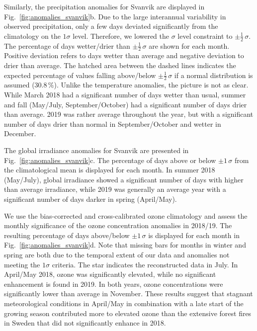 \documentclass[bg, manuscript]{copernicus}
\begin{document}
Similarly, the precipitation anomalies for Svanvik are displayed in Fig.~\ref{fig:anomalies_svanvik}b. Due to the large interannual variability in observed precipitation, only a few days deviated significantly from the climatology on the $1 \sigma$ level. Therefore, we lowered the $\sigma$ level constraint to $\pm \frac{1}{2}\,\sigma$. The percentage of days wetter/drier than $\pm \frac{1}{2}\,\sigma$ are shown for each month. Positive deviation refers to days wetter than average and negative deviation to drier than average. The hatched area between the dashed lines indicates the expected percentage of values falling above/below $\pm\frac{1}{2}\,\sigma$ if a normal distribution is assumed ($30.8\,\unit{\%}$). Unlike the temperature anomalies, the picture is not as clear. While March 2018 had a significant number of days wetter than usual, summer and fall (May/July, September/October) had a significant number of days drier than average. 2019 was rather average throughout the year, but with a significant number of days drier than normal in September/October and wetter in December.

The global irradiance anomalies for Svanvik are presented in Fig.~\ref{fig:anomalies_svanvik}c. The percentage of days above or below $\pm 1\,\sigma$ from the climatological mean is displayed for each month. In summer 2018 (May/July), global irradiance showed a significant number of days with higher than average irradiance, while 2019 was generally an average year with a significant number of days darker in spring (April/May).

We use the bias-corrected and cross-calibrated ozone climatology \citep{ACPD:Falk2021} and assess the monthly significance of the ozone concentration anomalies in 2018/19. The resulting percentage of days above/below $\pm 1\,\sigma$ is displayed for each month in Fig.~\ref{fig:anomalies_svanvik}d. Note that missing bars for months in winter and spring are both due to the temporal extent of our data and anomalies not meeting the $1\sigma$ criteria. The star indicates the reconstructed data in July. In April/May 2018, ozone was significantly elevated, while no significant enhancement is found in 2019. In both years, ozone concentrations were significantly lower than average in November. These results suggest that stagnant meteorological conditions in April/May in combination with a late start of the growing season contributed more to elevated ozone than the extensive forest fires in Sweden that did not significantly enhance \chem{[O_3]} in 2018.
\end{document}
